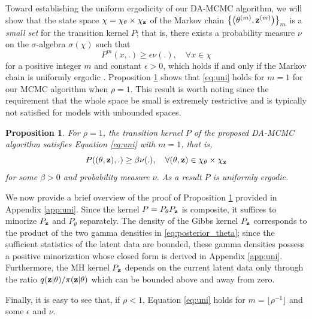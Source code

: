\documentclass[11pt]{article}
\newtheorem{proposition}{Proposition}[section]
\begin{document}
	Toward establishing the uniform ergodicity of our DA-MCMC algorithm, we will show that the state space $\chi = \chi_{\theta}\times\chi_{\mathbf{z}}$ of the Markov chain $\left\{\left(\theta^{(m)}, \mathbf{z}^{(m)}\right)\right\}_m$ is a \textit{small set} for the transition kernel $P$; that is, there exists a probability measure $\nu$ on the $\sigma$-algebra $\sigma(\chi)$ such that
	\begin{equation}
	\label{eq:uni}
	    P^m(x,.) \ge \epsilon \nu(.), \quad \forall x\in \chi
	\end{equation}
	for a positive integer $m$ and constant $\epsilon > 0$, which holds if and only if the Markov chain is uniformly ergodic \cite{Tierney.1994}.
	Proposition \ref{pro:uni} shows that \eqref{eq:uni} holds for $m=1$ for our MCMC algorithm when $\rho=1$. This result is worth noting since the requirement that the whole space be small is extremely restrictive and is typically not satisfied for models with unbounded spaces.
	
	\begin{proposition}
		\label{pro:uni}
		For $\rho = 1$, the transition kernel $P$ of the proposed DA-MCMC algorithm satisfies Equation \eqref{eq:uni} with $m=1$, that is,
		$$P((\theta, \mathbf{z}), .) \ge \beta \nu(.) , \quad \forall (\theta, \mathbf{z}) \in \chi_\theta \times \chi_{\mathbf{z}}
		$$
		for some $\beta>0$ and probability measure $\nu$. As a result $P$ is uniformly ergodic.
	\end{proposition}
	
	We now provide a brief overview of the proof of Proposition \ref{pro:uni} provided in Appendix \ref{app:uni}. Since the kernel $P = P_{\theta} P_{\mathbf{z}}$ is composite, it suffices to minorize $P_{\mathbf{z}}$ and $P_\theta$ separately. The density of the Gibbs kernel $P_{\mathbf{z}}$ corresponds to the product of the two gamma densities in \eqref{eq:posterior_theta}; since the sufficient statistics of the latent data are bounded, these gamma densities possess a positive minorization whose closed form is derived in Appendix \ref{app:uni}. Furthermore, the MH kernel $P_{\mathbf{z}}$ depends on the current latent data only through the ratio $q(\mathbf{z}|\theta)/\pi(\mathbf{z}|\theta)$ which can be bounded above and away from zero.
	
	Finally, it is easy to see that, if $\rho < 1$, Equation \eqref{eq:uni} holds for 
	$m=\lfloor \rho^{-1} \rfloor$ and some $\epsilon$ and $\nu$.
	
	
\end{document}
